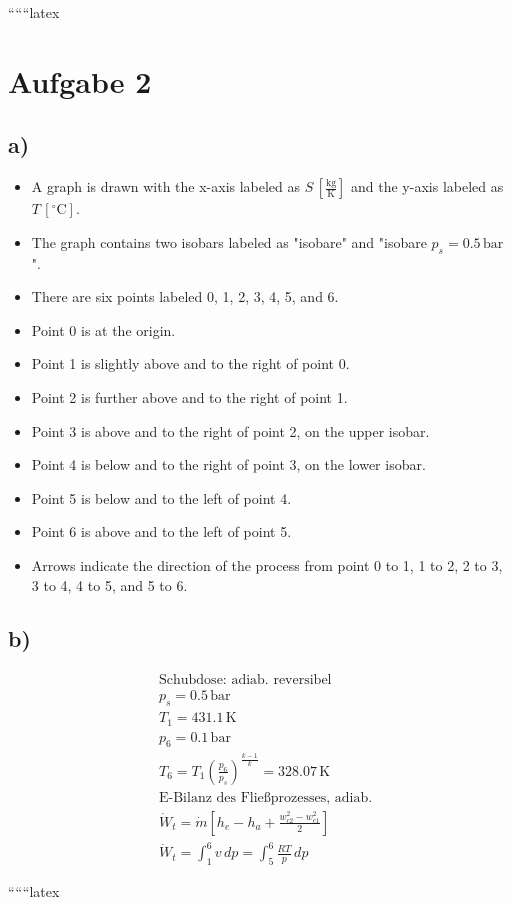 
``````latex


\section*{Aufgabe 2}

\subsection*{a)}

\begin{itemize}
    \item A graph is drawn with the x-axis labeled as $S \, [\frac{\text{kg}}{\text{K}}]$ and the y-axis labeled as $T \, [^\circ \text{C}]$.
    \item The graph contains two isobars labeled as "isobare" and "isobare $p_s = 0.5 \, \text{bar}$".
    \item There are six points labeled 0, 1, 2, 3, 4, 5, and 6.
    \item Point 0 is at the origin.
    \item Point 1 is slightly above and to the right of point 0.
    \item Point 2 is further above and to the right of point 1.
    \item Point 3 is above and to the right of point 2, on the upper isobar.
    \item Point 4 is below and to the right of point 3, on the lower isobar.
    \item Point 5 is below and to the left of point 4.
    \item Point 6 is above and to the left of point 5.
    \item Arrows indicate the direction of the process from point 0 to 1, 1 to 2, 2 to 3, 3 to 4, 4 to 5, and 5 to 6.
\end{itemize}

\subsection*{b)}

\begin{align*}
    &\text{Schubdose: adiab. reversibel} \\
    &p_s = 0.5 \, \text{bar} \\
    &T_1 = 431.1 \, \text{K} \\
    &p_6 = 0.1 \, \text{bar} \\
    &T_6 = T_1 \left( \frac{p_6}{p_s} \right)^{\frac{k-1}{k}} = 328.07 \, \text{K} \\
    &\text{E-Bilanz des Fließprozesses, adiab.} \\
    &\dot{W}_t = \dot{m} \left[ h_e - h_a + \frac{w_{c2}^2 - w_{c1}^2}{2} \right] \\
    &\dot{W}_t = \int_{1}^{6} v \, dp = \int_{5}^{6} \frac{R T}{p} \, dp
\end{align*}

``````latex


